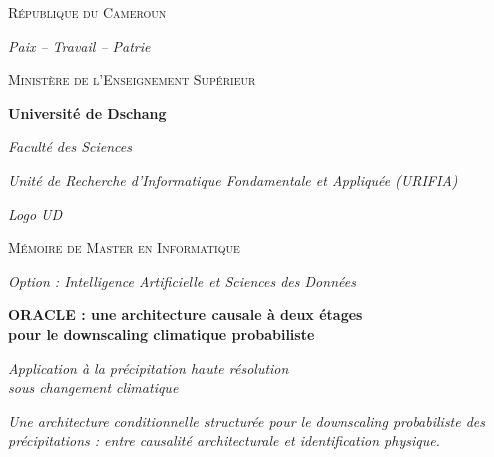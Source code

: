 \documentclass[14pt,a4paper,openany]{extreport}
\begin{document}
\thispagestyle{empty}
\begin{titlepage}
\centering

{\large \textsc{République du Cameroun} \par}
\vspace{0.2em}
{\small \textit{Paix -- Travail -- Patrie} \par}
\vspace{0.5em}
{\large \textsc{Ministère de l'Enseignement Supérieur} \par}
\vspace{0.5em}
{\large \textbf{Université de Dschang} \par}
\vspace{0.3em}
{\large \textit{Faculté des Sciences} \par}
\vspace{0.3em}
{\large \textit{Unité de Recherche d'Informatique Fondamentale et Appliquée (URIFIA)} \par}

\vspace{2em}
\begin{tcolorbox}[width=4cm,height=4cm,valign=center,colback=gray!10,colframe=gray!50,arc=2pt]
\centering\small\textit{Logo UD}
\end{tcolorbox}

\vspace{2em}
{\Large \textsc{Mémoire de Master en Informatique} \par}
\vspace{0.5em}
{\large \textit{Option : Intelligence Artificielle et Sciences des Données} \par}

\vspace{2.5em}
\begin{tcolorbox}[colback=uridarkblue!5,colframe=uridarkblue,boxrule=1pt,arc=2pt,
                  left=0.5em,right=0.5em,top=0.8em,bottom=0.8em]
\centering
{\LARGE\bfseries\color{uridarkblue}
ORACLE : une architecture causale à deux étages\\pour le downscaling climatique probabiliste \par}
\vspace{0.8em}
{\large\itshape Application à la précipitation haute résolution\\sous changement climatique \par}
\vspace{0.8em}
{\normalsize\itshape Une architecture conditionnelle structurée pour le downscaling probabiliste des précipitations : entre causalité architecturale et identification physique. \par}
\end{tcolorbox}


\end{titlepage}
\end{document}
